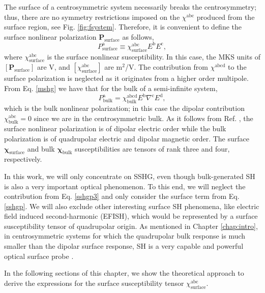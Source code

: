 The surface of a centrosymmetric system necessarily breaks the centrosymmetry;
thus, there are no symmetry restrictions imposed on the $\chi^{\mathrm{abc}}$
produced from the surface region, see Fig. \ref{fig:fsystem}. Therefore, it is
convenient to define the surface nonlinear polarization
$\mathbf{P}_{\mathrm{surface}}$ as follows,
\begin{equation}\label{sshgp}
P^{\mathrm{a}}_{\mathrm{surface}}
\equiv \chi^{\mathrm{abc}}_{\mathrm{surface}}E^{\mathrm{b}}E^{\mathrm{c}},
\end{equation}
where $\chi^{\mathrm{abc}}_{\mathrm{surface}}$ is the surface nonlinear
susceptibility. In this case, the MKS units of $[\mathbf{P}_{\mathrm{surface}}]$
are V, and $[\chi^{\mathrm{abc}}_{\mathrm{surface}}]$ are m$^{2}$/V. The
contribution from $\chi^{\mathrm{abcd}}$ to the surface polarization is
neglected as it originates from a higher order multipole. From Eq. \eqref{mshg}
we have that for the bulk of a semi-infinite system,
\begin{equation}\label{sshgp3}
P^{\mathrm{a}}_{\mathrm{bulk}}
= \chi^{\mathrm{abcd}}_{\mathrm{bulk}}
  E^{\mathrm{b}}\nabla^{\mathrm{c}}E^{\mathrm{d}},  
\end{equation}
which is the bulk nonlinear polarization; in this case the dipolar contribution
$\chi^{\mathrm{abc}}_{\mathrm{bulk}} = 0$ since we are in the centrosymmetric
bulk. As it follows from Ref. \cite{bloembergenPR62}, the surface nonlinear
polarization is of dipolar electric order while the bulk polarization is of
quadrupolar electric and dipolar magnetic order. The surface
$\boldsymbol{\chi}_{\mathrm{surface}}$ and bulk
$\boldsymbol{\chi}_{\mathrm{bulk}}$ susceptibilities are tensors of rank
three and four, respectively.

In this work, we will only concentrate on SSHG, even though bulk-generated SH is
also a very important optical phenomenon. To this end, we will neglect the
contribution from Eq. \eqref{sshgp3} and only consider the surface term from Eq.
\eqref{sshgp}. We will also exclude other interesting surface SH phenomena, like
electric field induced second-harmonic (EFISH), which would be represented by a
surface susceptibility tensor of quadrupolar origin. As mentioned in Chapter
\ref{chap:intro}, in centrosymmetric systems for which the quadrupolar bulk
response is much smaller than the dipolar surface response, SH is a very capable
and powerful optical surface probe \cite{downerSIA01}.

In the following sections of this chapter, we show the theoretical
approach to derive the expressions for the surface susceptibility tensor
$\chi^{\mathrm{abc}}_{\mathrm{surface}}$.

